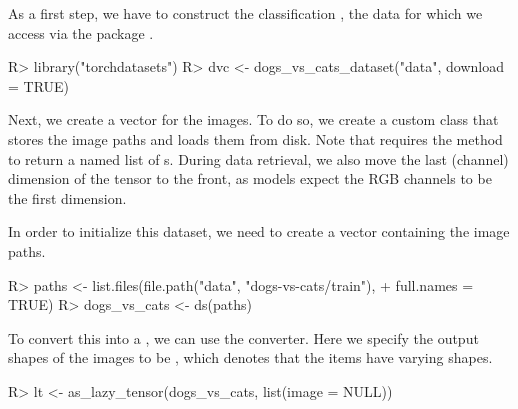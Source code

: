 \documentclass[article,shortnames]{jss}
\theoremstyle{definition}
\renewenvironment{CodeChunk}{\par\addvspace{0.6\baselineskip}\noindent\begin{minipage}{\linewidth}}{\end{minipage}\par\vspace{0.6\baselineskip}}
\begin{document}
As a first step, we have to construct the classification , the data for which we access via the  package \citep{torchdatasets}.

\begin{CodeChunk}
\begin{CodeInput}
R> library("torchdatasets")
R> dvc <- dogs_vs_cats_dataset("data", download = TRUE)
\end{CodeInput}
\end{CodeChunk}

Next, we create a  vector for the images.
To do so, we create a custom  class that stores the image paths and loads them from disk.
Note that  requires the  method to return a named list of s.
During data retrieval, we also move the last (channel) dimension of the tensor to the front, as  models expect the RGB channels to be the first dimension.

\begin{CodeChunk}
\end{CodeChunk}

In order to initialize this dataset, we need to create a vector containing the image paths.

\begin{CodeChunk}
\begin{CodeInput}
R> paths <- list.files(file.path("data", "dogs-vs-cats/train"),
+    full.names = TRUE)
R> dogs_vs_cats <- ds(paths)
\end{CodeInput}
\end{CodeChunk}

To convert this into a , we can use the  converter.
Here we specify the output shapes of the images to be , which denotes that the items have varying shapes.

\begin{CodeChunk}
\begin{CodeInput}
R> lt <- as_lazy_tensor(dogs_vs_cats, list(image = NULL))
\end{CodeInput}
\end{CodeChunk}
\end{document}
